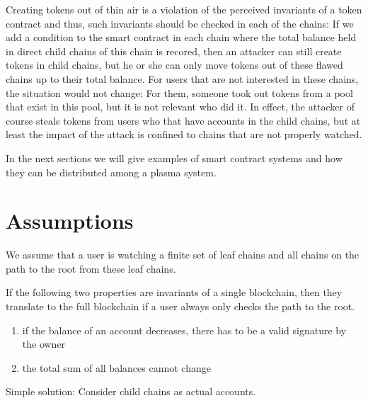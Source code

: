 \documentclass[11pt,letterpaper]{article}
\begin{document}
Creating tokens out of thin air is a violation of the perceived invariants
of a token contract and thus, such invariants should be checked in each of the
chains: If we add a condition to the smart contract in each chain where the total balance
held in direct child chains of this chain is recored, then an attacker can still
create tokens in child chains, but he or she can only move tokens out of these
flawed chains up to their total balance. For users that are not interested
in these chains, the situation would not change: For them, someone took out
tokens from a pool that exist in this pool, but it is not relevant who did it.
In effect, the attacker of course steals tokens from users who that have
accounts in the child chains, but at least the impact of the attack is
confined to chains that are not properly watched.

In the next sections we will give examples of smart contract systems
and how they can be distributed among a plasma system.

\section{Assumptions}

We assume that a user is watching a finite set of leaf chains
and all chains on the path to the root from these leaf chains.


If the following two properties are invariants of a single blockchain, then they
translate to the full blockchain if a user always only checks the path to the root.

\begin{enumerate}
\item if the balance of an account decreases, there has to be a valid signature by the owner
\item the total sum of all balances cannot change
\end{enumerate}

Simple solution: Consider child chains as actual accounts.



\end{document}
